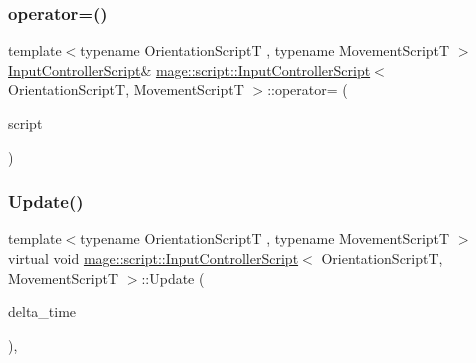 \hypertarget{classmage_1_1script_1_1_input_controller_script_a4d13e3a38c42780f31e955128681d6d0}{}\label{classmage_1_1script_1_1_input_controller_script_a4d13e3a38c42780f31e955128681d6d0} 
\subsubsection{\texorpdfstring{operator=()}{operator=()}\hspace{0.1cm}{\footnotesize\ttfamily [2/2]}}
{\footnotesize\ttfamily template$<$typename Orientation\+ScriptT , typename Movement\+ScriptT $>$ \\
\hyperlink{classmage_1_1script_1_1_input_controller_script}{Input\+Controller\+Script}\& \hyperlink{classmage_1_1script_1_1_input_controller_script}{mage\+::script\+::\+Input\+Controller\+Script}$<$ Orientation\+ScriptT, Movement\+ScriptT $>$\+::operator= (\begin{DoxyParamCaption}\item[{\hyperlink{classmage_1_1script_1_1_input_controller_script}{Input\+Controller\+Script}$<$ Orientation\+ScriptT, Movement\+ScriptT $>$ \&\&}]{script }\end{DoxyParamCaption})\hspace{0.3cm}{\ttfamily [delete]}}

\hypertarget{classmage_1_1script_1_1_input_controller_script_ab013f70add87cec139fd72bb24af5846}{}\label{classmage_1_1script_1_1_input_controller_script_ab013f70add87cec139fd72bb24af5846} 
\subsubsection{\texorpdfstring{Update()}{Update()}}
{\footnotesize\ttfamily template$<$typename Orientation\+ScriptT , typename Movement\+ScriptT $>$ \\
virtual void \hyperlink{classmage_1_1script_1_1_input_controller_script}{mage\+::script\+::\+Input\+Controller\+Script}$<$ Orientation\+ScriptT, Movement\+ScriptT $>$\+::Update (\begin{DoxyParamCaption}\item[{\mbox{[}\mbox{[}maybe\+\_\+unused\mbox{]} \mbox{]} \hyperlink{namespacemage_ad26233bbec640deda836e572c1a23708}{F64}}]{delta\+\_\+time }\end{DoxyParamCaption})\hspace{0.3cm}{\ttfamily [override]}, {\ttfamily [virtual]}}

